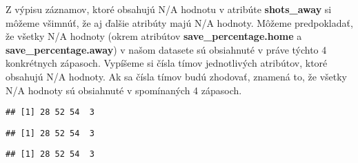 \documentclass[
]{article}
\newenvironment{Shaded}{\begin{snugshade}}{\end{snugshade}}
\newcommand{\FunctionTok}[1]{\textcolor[rgb]{0.00,0.00,0.00}{#1}}
\newcommand{\NormalTok}[1]{#1}
\newcommand{\SpecialCharTok}[1]{\textcolor[rgb]{0.00,0.00,0.00}{#1}}
\begin{document}
Z výpisu záznamov, ktoré obsahujú N/A hodnotu v atribúte
\textbf{shots\_away} si môžeme všimnúť, že aj ďalšie atribúty majú N/A
hodnoty. Môžeme predpokladať, že všetky N/A hodnoty (okrem atribútov
\textbf{save\_percentage.home} a \textbf{save\_percentage.away}) v našom
datasete sú obsiahnuté v práve týchto 4 konkrétnych zápasoch. Vypíšeme
si čísla tímov jednotlivých atribútov, ktoré obsahujú N/A hodnoty. Ak sa
čísla tímov budú zhodovať, znamená to, že všetky N/A hodnoty sú
obsiahnuté v spomínaných 4 zápasoch.

\begin{Shaded}
\end{Shaded}

\begin{verbatim}
## [1] 28 52 54  3
\end{verbatim}

\begin{Shaded}
\end{Shaded}

\begin{verbatim}
## [1] 28 52 54  3
\end{verbatim}

\begin{Shaded}
\end{Shaded}

\begin{verbatim}
## [1] 28 52 54  3
\end{verbatim}

\begin{Shaded}
\end{Shaded}
\end{document}
